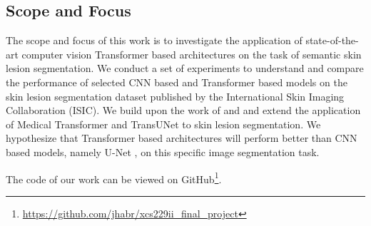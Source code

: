 \subsection{Scope and Focus}

The scope and focus of this work is to investigate the application of state-of-the-art computer vision Transformer based architectures on the task of semantic skin lesion segmentation. We conduct a set of experiments to understand and compare the performance of selected CNN based and Transformer based models on the skin lesion segmentation dataset published by the International Skin Imaging Collaboration (ISIC). We build upon the work of \citep{medical_transformer-2021-valanarasu} and \citep{transunet-2021-chen} and extend the application of Medical Transformer and TransUNet to skin lesion segmentation.  We hypothesize that Transformer based architectures will perform better than CNN based models, namely U-Net \citep{unet-2015-ronneberger}, on this specific image segmentation task.


\par
The code of our work can be viewed on GitHub\footnote{\url{https://github.com/jhabr/xcs229ii_final_project}}.



